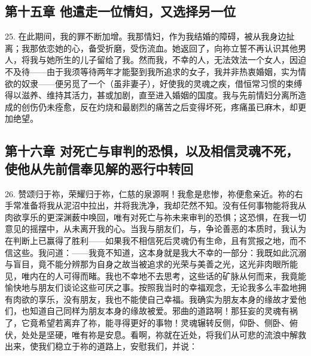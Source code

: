 \subsection{第十五章 他遣走一位情妇，又选择另一位}

25. 在此期间，我的罪不断加增。我那情妇，作为我结婚的障碍，被从我身边扯离；我那依恋她的心，备受折磨，受伤流血。她返回了，向祢立誓不再认识其他男人，将我与她所生的儿子留给了我。然而我，不幸的人，无法效法一个女人，因迫不及待——由于我须等待两年才能娶到我所追求的女子，我并非热衷婚姻，实为情欲的奴隶——便另觅了一个（虽非妻子），好使我的灵魂之疾，借恒常习惯的束缚得以滋养、维持其活力，甚或加剧，直至进入婚姻的国度。我与先前情妇分离所造成的创伤仍未痊愈，反在灼烧和最剧烈的痛苦之后变得坏死，疼痛虽已麻木，却更加绝望。\par


\subsection{第十六章 对死亡与审判的恐惧，以及相信灵魂不死，使他从先前信奉见解的恶行中转回}

26. 赞颂归于祢，荣耀归于祢，仁慈的泉源啊！我愈是悲惨，祢便愈亲近。祢的右手常准备将我从泥沼中拉出，并将我洗净，我却茫然不知。没有任何事物能将我从肉欲享乐的更深渊薮中唤回，唯有对死亡与祢未来审判的恐惧；这恐惧，在我一切意见的摇摆中，从未离开我的心。当我与朋友们，与，争论善恶的本质时，我认为在判断上已赢得了胜利——如果我不相信死后灵魂仍有生命，且有赏报之地，而不信这些。我问道：——我竟不知道，这本身就是我大不幸的一部分：我既如此沉溺与盲目，竟不能分辨那为自身之故当被追求的光荣与美善之光，这光非肉眼所能见，唯内在的人可得而睹。我也不幸地不去思考，这些话的矿脉从何而来，我竟能愉快地与朋友们谈论这些可厌之事。按照我当时的幸福观念，无论我多么丰盈地拥有肉欲的享乐，没有朋友，我也不能使自己幸福。我确实为朋友本身的缘故才爱他们，也知道自己同样为朋友本身的缘故被爱。邪曲的道路啊！那狂妄的灵魂有祸了，它竟希望若离弃了祢，能寻得更好的事物！灵魂辗转反侧，仰卧、侧卧、俯伏，处处是坚硬，唯有祢是安息。看啊，祢就在近处，将我们从可悲的流浪中解救出来，使我们稳立于祢的道路上，安慰我们，并说：\par

